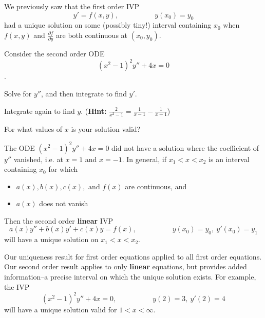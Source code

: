 \begin{applicationActivities}

\begin{observation}
We previously saw that the first order IVP
\[ y'=f(x,y), \hspace{5em} y(x_0)=y_0 \]
had a unique solution on some (possibly tiny!) interval containing \(x_0\) when \(f(x,y)\) and \(\frac{\partial f}{\partial y}\) are both continuous at \((x_0,y_0)\).
\vfill
\end{observation}

\begin{activity}{10}
Consider the second order ODE 
\[(x^2-1)^2y''+4x=0\].
\begin{subactivity}
Solve for \(y''\), and then integrate to find \(y'\).
\end{subactivity}
\begin{subactivity}
Integrate again to find \(y\). ({\bf Hint: } \(\frac{2}{x^2-1}=\frac{1}{x-1}-\frac{1}{x+1}\))
\end{subactivity}
\begin{subactivity}
For what values of \(x\) is your solution valid?
\end{subactivity}
\end{activity}

\begin{observation}
The ODE \( (x^2-1)^2y''+4x=0\) did not have a solution where the coefficient of \(y''\) vanished, i.e. at \(x=1\) and \(x=-1\).
\vfill
In general, if \(x_1 < x < x_2\) is an interval containing \(x_0\) for which
\begin{itemize}
\item \(a(x),b(x),c(x),\text{ and } f(x)\) are continuous, and
\item \( a(x)\) does not vanish
\end{itemize}
Then the second order {\bf linear} IVP
\[ a(x)y''+b(x)y'+c(x)y=f(x), \hspace{5em} y(x_0)=y_0,\ y'(x_0)=y_1 \]
will have a unique solution on \(x_1<x<x_2\).
\end{observation}

\begin{observation}
Our uniqueness result for first order equations applied to all first order equations.  Our second order result applies to only {\bf linear} equations, but provides added information--a precise interval on which the unique solution exists.
\vfill
For example, the IVP 
\[ (x^2-1)^2y''+4x=0 , \hspace{5em} y(2)=3,\ y'(2)=4\]
will have a unique solution valid for \(1<x<\infty\).
\end{observation}



\end{applicationActivities}
